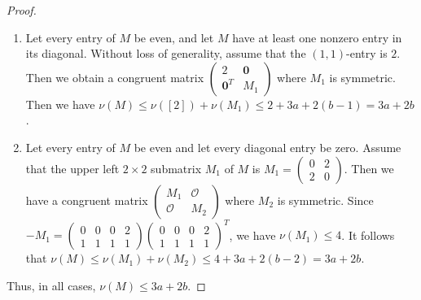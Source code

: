 \documentclass{article}
\theoremstyle{definition}
\theoremstyle{remark}
\begin{document}
\begin{proof}
\begin{enumerate}
\[\begin{cases}
\begin{bmatrix}
                0 & 1 & 1\\1 & 0 & -u
            \end{bmatrix}, & \text{if }m_1=m_2=2,\\[1.0em]
            \begin{bmatrix}
                0 & 1 & 1 & 1 & 1\\1 & 0 & 0 & 0 & -u
            \end{bmatrix}, & \text{if }m_1=0,\, m_2=2,\\[1.0em]
            \begin{bmatrix}
                1 & 0 & 0 & 0 & -u\\0 & 1 & 1 & 1 & 1
            \end{bmatrix}, & \text{if }m_1=2,\, m_2=0,\\[1.0em]
            \begin{bmatrix}
                0 & 1 & 1 & 1 & 1\\1 & 1 & 1 & 0 & u
            \end{bmatrix}, & \text{if }m_1=m_2=0.\\
        \end{cases}
        \]
        Since $AA^T=-M_1$, we have $\nu(M_1)\le 5\le 6$. Hence, we obtain $\nu(M)\le \nu(M_1)+\nu(M_2)\le 3\cdot 2+3(a-2)+2b=3a+2b$.
        \item[(iii)] Let every entry of $M$ be even, and let $M$ have at least one nonzero entry in its diagonal. Without loss of generality, assume that the $(1, 1)$-entry is $2$. Then we obtain a congruent matrix $\begin{pmatrix}
            2 & \mathbf{0}\\\mathbf{0}^T & M_1
        \end{pmatrix}$ where $M_1$ is symmetric. Then we have $\nu(M)\le \nu([2])+\nu(M_1)\le 2+3a+2(b-1)=3a+2b$.
        \item[(iv)] Let every entry of $M$ be even and let every diagonal entry be zero. Assume that the upper left $2\times 2$ submatrix $M_1$ of $M$ is $M_1=\begin{pmatrix}
            0 & 2\\2 & 0
        \end{pmatrix}$. Then we have a congruent matrix $\begin{pmatrix} M_1 & \mathcal{O}\\\mathcal{O} & M_2\end{pmatrix}$ where $M_2$ is symmetric. Since $-M_1=\begin{pmatrix}0 & 0 & 0 & 2\\1 & 1 & 1 &1 \end{pmatrix}\begin{pmatrix}0 & 0 & 0 & 2\\1 & 1 & 1 &1 \end{pmatrix}^T$, we have $\nu(M_1)\le 4$. It follows that $\nu(M)\le \nu(M_1)+\nu(M_2)\le 4+3a+2(b-2)=3a+2b$.  
    \end{enumerate}
    Thus, in all cases, $\nu(M)\le 3a+2b$.
\end{proof}
\end{document}

